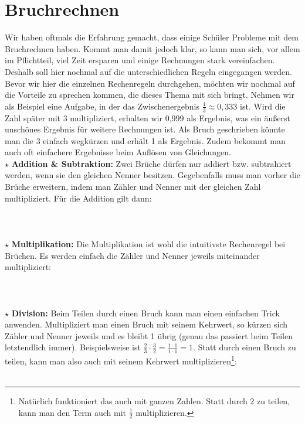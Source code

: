 \section{Bruchrechnen}
	Wir haben oftmals die Erfahrung gemacht, dass einige Schüler Probleme mit dem
	Bruchrechnen haben. Kommt man damit jedoch klar, so kann man sich, vor allem im
	Pflichtteil, viel Zeit ersparen und einige Rechnungen stark vereinfachen.
	Deshalb soll hier nochmal auf die unterschiedlichen Regeln eingegangen
	werden.\\
	Bevor wir hier die einzelnen Rechenregeln durchgehen, möchten wir
	nochmal auf die Vorteile zu sprechen kommen, die dieses Thema mit sich
	bringt. Nehmen wir als Beispiel eine Aufgabe, in der das Zwischenergebnis
	\(\frac{1}{3}\approx 0,333\) ist. Wird die Zahl später mit 3 multipliziert,
	erhalten wir 0,999 als Ergebnis, was ein äußerst unschönes Ergebnis für weitere Rechnungen ist. Als Bruch
	geschrieben könnte man die 3 einfach wegkürzen und erhält 1 als Ergebnis.
	Zudem bekommt man auch oft einfachere Ergebnisse beim Auflösen von Gleichungen.\\
	
	\(\star\) \textbf{Addition \& Subtraktion: } Zwei Brüche dürfen nur addiert
	bzw. subtrahiert werden, wenn sie den gleichen Nenner besitzen. Gegebenfalls
	muss man vorher die Brüche erweitern, indem man Zähler und Nenner mit der
	gleichen Zahl multipliziert. Für die Addition gilt dann:
	\\ \\
	\formel{\[\frac{a}{c}\pm\frac{b}{c}=\frac{a\pm b}{c}\]}
	\\ \\
	\(\star\) \textbf{Multiplikation: } Die Multiplikation ist wohl die intuitivste
	Rechenregel bei Brüchen. Es werden einfach die Zähler und Nenner
	jeweils miteinander multipliziert:
	\\ \\
	\formel{\[ \frac{a}{b} \cdot \frac{c}{d} = \frac{a\cdot c}{b\cdot c} \]}
	\\ \\
	\(\star\) \textbf{Division: } Beim Teilen durch einen Bruch kann man einen
	einfachen Trick anwenden. Multipliziert man einen Bruch mit seinem Kehrwert, so
	kürzen sich Zähler und Nenner jeweils und es bleibt 1 übrig (genau das
	passiert beim Teilen letztendlich immer). Beispielsweise ist
	\(\frac{2}{3}\cdot\frac{3}{2}=\frac{1\cdot 1}{1\cdot 1}=1\). Statt durch einen
	Bruch zu teilen, kann man also auch mit seinem Kehrwert
	multiplizieren\footnote{Natürlich funktioniert das auch mit ganzen Zahlen.
	Statt durch 2 zu teilen, kann man den Term auch mit \(\frac{1}{2}\)
	multiplizieren.}:
	\\ \\
	\( \) %
	\formel{ \[ \frac{a}{b} : \frac{c}{d} = \frac{a}{b} \cdot \frac{d}{c} \] }
	
